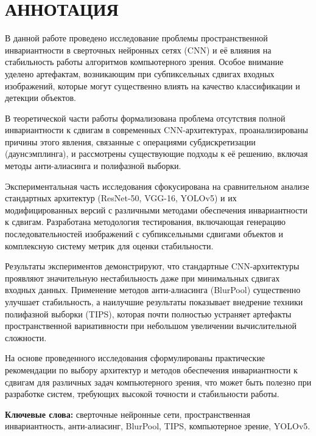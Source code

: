\newpage
\section*{АННОТАЦИЯ}
\thispagestyle{empty}

В данной работе проведено исследование проблемы пространственной инвариантности в сверточных нейронных сетях (CNN) и её влияния на стабильность работы алгоритмов компьютерного зрения. Особое внимание уделено артефактам, возникающим при субпиксельных сдвигах входных изображений, которые могут существенно влиять на качество классификации и детекции объектов.

В теоретической части работы формализована проблема отсутствия полной инвариантности к сдвигам в современных CNN-архитектурах, проанализированы причины этого явления, связанные с операциями субдискретизации (даунсэмплинга), и рассмотрены существующие подходы к её решению, включая методы анти-алиасинга и полифазной выборки.

Экспериментальная часть исследования сфокусирована на сравнительном анализе стандартных архитектур (ResNet-50, VGG-16, YOLOv5) и их модифицированных версий с различными методами обеспечения инвариантности к сдвигам. Разработана методология тестирования, включающая генерацию последовательностей изображений с субпиксельными сдвигами объектов и комплексную систему метрик для оценки стабильности.

Результаты экспериментов демонстрируют, что стандартные CNN-архитектуры проявляют значительную нестабильность даже при минимальных сдвигах входных данных. Применение методов анти-алиасинга (BlurPool) существенно улучшает стабильность, а наилучшие результаты показывает внедрение техники полифазной выборки (TIPS), которая почти полностью устраняет артефакты пространственной вариативности при небольшом увеличении вычислительной сложности.

На основе проведенного исследования сформулированы практические рекомендации по выбору архитектур и методов обеспечения инвариантности к сдвигам для различных задач компьютерного зрения, что может быть полезно при разработке систем, требующих высокой точности и стабильности работы.

\bigskip
\textbf{Ключевые слова:} сверточные нейронные сети, пространственная инвариантность, анти-алиасинг, BlurPool, TIPS, компьютерное зрение, YOLOv5.

\newpage